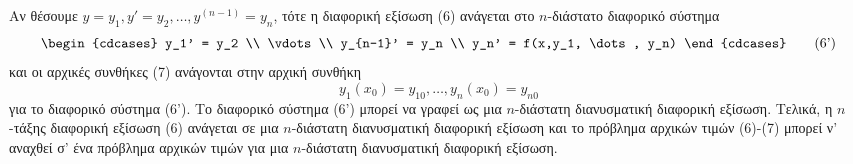 \documentclass[11pt,a4paper,twoside]{book}
\begin{document}
Αν θέσουμε $y=y_1, y'=y_2, \dots, y^{(n-1)}=y_n$, τότε η διαφορική εξίσωση (6) ανάγεται στο $n$-διάστατο διαφορικό σύστημα
\begin{equation*} \label{eq:6prime}
\begin{cdcases}
y_1' = y_2 \\
\vdots \\
y_{n-1}' = y_n \\
y_n' = f(x,y_1, \dots, y_n)
\end{cdcases} \tag{6'}
\end{equation*}
και οι αρχικές συνθήκες (7) ανάγονται στην αρχική συνθήκη
\begin{equation*} \label{eq:7prime}
y_1(x_0)=y_{10}, \dots, y_n(x_0)=y_{n0} \tag{7'}
\end{equation*}
για το διαφορικό σύστημα (6'). Το διαφορικό σύστημα (6') μπορεί να γραφεί ως μια $n$-διάστατη διανυσματική διαφορική εξίσωση. Τελικά, η $n$-τάξης διαφορική εξίσωση (6) ανάγεται σε μια $n$-διάστατη διανυσματική διαφορική εξίσωση και το πρόβλημα αρχικών τιμών (6)-(7) μπορεί ν' αναχθεί σ' ένα πρόβλημα αρχικών τιμών για μια $n$-διάστατη διανυσματική διαφορική εξίσωση.
\end{document}

